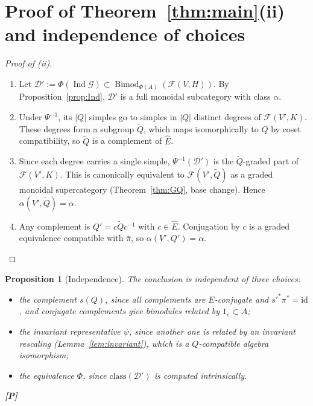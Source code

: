 \documentclass[11pt]{article}
\newtheorem{proposition}[theorem]{Proposition}
\theoremstyle{definition}
\newcommand{\cD}{\mathcal D}
\newcommand{\cF}{\mathcal F}
\newcommand{\cG}{\mathcal G}
\newcommand{\Bimod}{\operatorname{Bimod}}
\newcommand{\Ind}{\operatorname{Ind}}
\newcommand{\Ehat}{\widehat E}
\newcommand{\st}[1]{\textbf{[#1]}}
\begin{document}
\section{Proof of Theorem~\ref{thm:main}(ii) and independence of choices}\label{sec:proof}

\begin{proof}[Proof of (ii)]
\begin{enumerate}[nosep]
\item Let $\cD':=\Phi(\Ind\cG)\subset\Bimod_{\Phi(A)}(\cF(V,H))$. By
Proposition~\ref{prop:Ind}, $\cD'$ is a full monoidal subcategory with class $\alpha$.
\item Under $\Psi^{-1}$, its $|Q|$ simples go to simples in $|Q|$ distinct degrees of
$\cF(V',K)$. These degrees form a subgroup $\widetilde Q$, which maps isomorphically to $Q$ by
coset compatibility, so $\widetilde Q$ is a complement of $\Ehat$.
\item Since each degree carries a single simple, $\Psi^{-1}(\cD')$ is the $\widetilde Q$-graded part
of $\cF(V',K)$. This is canonically equivalent to $\cF(V',\widetilde Q)$ as a graded monoidal
supercategory (Theorem~\ref{thm:GQ}, base change). Hence
$\alpha(V',\widetilde Q)=\alpha$.
\item Any complement is $Q'=c\widetilde Qc^{-1}$ with $c\in\Ehat$. Conjugation by $c$ is a graded
equivalence compatible with $\bar\pi$, so $\alpha(V',Q')=\alpha$.
\end{enumerate}
\end{proof}

\begin{proposition}[Independence]\label{prop:indep}
The conclusion is independent of three choices:
\begin{itemize}[nosep]
\item the complement $s(Q)$, since all complements are $E$-conjugate and $s'^*\pi^*=\mathrm{id}$,
and conjugate complements give bimodules related by $1_e\subset A$;
\item the invariant representative $\psi$, since another one is related by an invariant rescaling
(Lemma~\ref{lem:invariant}), which is a $Q$-compatible algebra isomorphism;
\item the equivalence $\Phi$, since $\mathrm{class}(\cD')$ is computed intrinsically.
\end{itemize}
\st{P}
\end{proposition}

\end{document}
